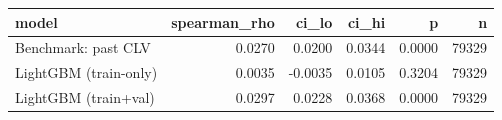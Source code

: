 \begin{tabular}{lrrrrr}
\toprule
model & spearman\_rho & ci\_lo & ci\_hi & p & n \\
\midrule
Benchmark: past CLV & 0.0270 & 0.0200 & 0.0344 & 0.0000 & 79329 \\
LightGBM (train-only) & 0.0035 & -0.0035 & 0.0105 & 0.3204 & 79329 \\
LightGBM (train+val) & 0.0297 & 0.0228 & 0.0368 & 0.0000 & 79329 \\
\bottomrule
\end{tabular}
